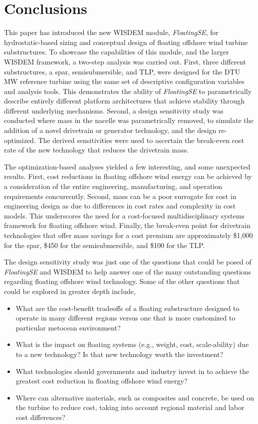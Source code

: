 \section{Conclusions}
\label{sec:conc}

This paper has introduced the new WISDEM module, \textit{FloatingSE},
for hydrostatic-based sizing and conceptual design of floating offshore
wind turbine substructures.  To showcase the capabilities of this
module, and the larger WISDEM framework, a two-step analysis was carried
out.  First, three different substructures, a spar, semisubmersible, and
TLP, were designed for the DTU \unit[10]{MW} reference turbine using the
same set of descriptive configuration variables and analysis tools.  This
demonstrates the ability of \textit{FloatingSE} to parametrically
describe entirely different platform architectures that achieve
stability through different underlying mechanisms.  Second, a design
sensitivity study was conducted where mass in the nacelle was
parametrically removed, to simulate the addition of a novel drivetrain
or generator technology, and the design re-optimized.  The derived
sensitivities were used to ascertain the break-even cost rate of the new
technology that reduces the drivetrain mass.

The optimization-based analyses yielded a few interesting, and some
unexpected results.  First, cost reductions in floating offshore wind
energy can be achieved by a consideration of the entire engineering,
manufacturing, and operation requirements concurrently.  Second, mass
can be a poor surrogate for cost in engineering design as due to
differences in cost rates and complexity in cost models.  This
underscores the need for a cost-focused multidisciplinary systems
framework for floating offshore wind.  Finally, the break-even point for
drivetrain technologies that offer mass savings for a cost premium are
approximately \$1,000 for the spar, \$450 for the semisubmersible, and
\$100 for the TLP.

The design sensitivity study was just one of the questions that could be
posed of \textit{FloatingSE} and WISDEM to help answer one of the many
outstanding questions regarding floating offshore wind technology.  Some
of the other questions that could be explored in greater depth include,
\begin{itemize}
\item What are the cost-benefit tradeoffs of a floating substructure
  designed to operate in many different regions versus one that is more
  customized to particular metocean environment?
\item What is the impact on floating systems (e.g., weight, cost,
  scale-ability) due to a new technology?  Is that new
  technology worth the investment?
\item What technologies should governments and industry invest in to
  achieve the greatest cost reduction in floating offshore wind energy?
\item Where can alternative materials, such as composites and concrete,
  be used on the turbine to reduce cost, taking into account regional
  material and labor cost differences?
\end{itemize}

